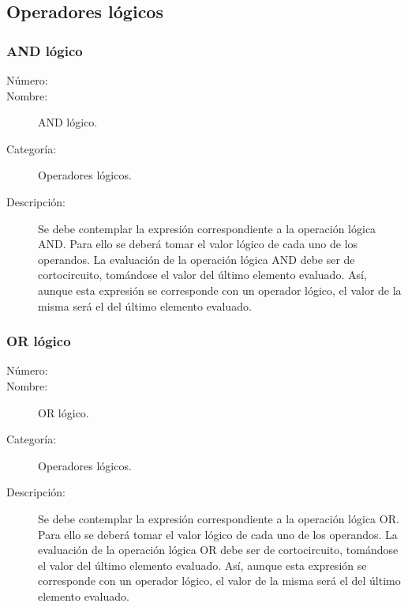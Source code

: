\subsection{Operadores lógicos}
\subsubsection{AND lógico}
\begin{framed}
	\begin{description}
		\item [Número:] \cn
		\item [Nombre:] AND lógico.
		\item [Categoría:] Operadores lógicos.
		\item [Descripción:] Se debe contemplar la expresión correspondiente a la operación lógica AND. Para ello se deberá tomar
		el valor lógico de cada uno de los operandos. La evaluación de la operación lógica AND debe ser de cortocircuito, tomándose el valor del
		último elemento evaluado. Así, aunque esta expresión se corresponde con un operador lógico, el valor de la misma será el del
		último elemento evaluado.
	\end {description}
\end{framed}

\subsubsection{OR lógico}
\begin{framed}
	\begin{description}
		\item [Número:] \cn
		\item [Nombre:] OR lógico.
		\item [Categoría:] Operadores lógicos.
		\item [Descripción:] Se debe contemplar la expresión correspondiente a la operación lógica OR. Para ello se deberá tomar
		el valor lógico de cada uno de los operandos. La evaluación de la operación lógica OR debe ser de cortocircuito, tomándose el valor del
		último elemento evaluado. Así, aunque esta expresión se corresponde con un operador lógico, el valor de la misma será el del
		último elemento evaluado.
	\end {description}
\end{framed}

